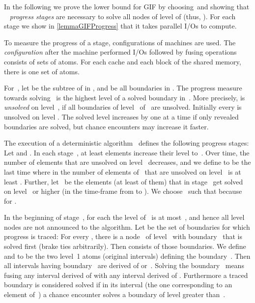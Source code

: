 \documentclass[envcountsame]{llncs}
\def\bOm#1{\printmath{\Omega \left(#1\right)}}
\begin{document}
In the following we prove the lower bound for GIF by choosing~\levelOfTracedAtoms and showing that ~ \emph{progress stages} are necessary to solve all nodes  of level \levelOfTracedAtoms of \binaryTreeOf{\gifInstance} (thus, ). 
For each stage we show in \autoref{lemmaGIFProgress} that it takes \bOm{\log\inputSize} parallel I/Os to compute.


To measure the progress of a stage, configurations of \fusePEM machines are used.
The \emph{configuration}  after the \fusePEM machine performed  I/Os followed by fusing operations consists of sets of atoms.
For each cache and each block of the shared memory, there is one set of atoms.



For~, let  be the subtree of  in \binaryTreeOf{\gifInstance}, and  be all boundaries in . The progress measure towards solving~ is the highest level of a solved boundary in~.
More precisely,  is \emph{unsolved} on level~, if all boundaries of level~ of~ are unsolved. 
Initially every  is unsolved on level . The solved level increases by one at a time if only revealed boundaries are solved, but chance encounters may increase it faster.





The execution of a deterministic algorithm~ defines the following \varStages progress stages:
Let  and .
In each stage~, at least  elements increase their level to~.
Over time, the number of elements that are unsolved on level~ decreases, and we define  to be the last time where in  the number of elements of~ that are unsolved on level~ is at least .
Further, let~ be the elements (at least  of them) that in stage~ get solved on level~ or higher (in the time-frame from  to ).
We choose~ such that  because  for .



In the beginning of stage~, for each  the level of~ is at most~, and hence all level~ nodes are not announced to the algorithm. 
Let  be the set of boundaries for which progress is traced:
For every , there is a node~ of level~ with boundary~ that is solved first (brake ties arbitrarily). 
Then  consists of those boundaries.
We define~ and  to be the two level~1 atoms (original intervals) defining the boundary~.
Then all intervals having boundary~ are derived of  or~.
Solving the boundary~ means fusing any interval derived of  with any interval derived of . 
Furthermore a traced boundary is considered solved if in its interval (the one corresponding to an element of~) a chance encounter solves a boundary of level greater than~.
\end{document}
